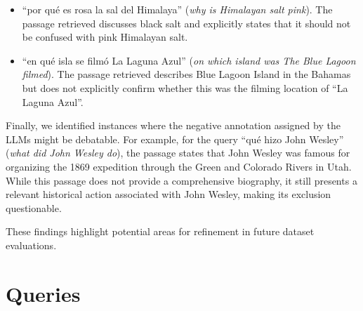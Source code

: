 \documentclass[11pt]{article}
\begin{document}
\begin{itemize}[wide, itemindent=, itemsep=0pt]
    \item ``por qué es rosa la sal del Himalaya'' (\emph{why is Himalayan salt pink}). The passage retrieved discusses black salt and explicitly states that it should not be confused with pink Himalayan salt.
    
    \item ``en qué isla se filmó La Laguna Azul'' (\emph{on which island was The Blue Lagoon filmed}). The passage retrieved describes Blue Lagoon Island in the Bahamas but does not explicitly confirm whether this was the filming location of ``La Laguna Azul''.
    
\end{itemize}

Finally, we identified instances where the negative annotation assigned by the LLMs might be debatable. For example, for the query ``qué hizo John Wesley'' (\emph{what did John Wesley do}), the passage states that John Wesley was famous for organizing the 1869 expedition through the Green and Colorado Rivers in Utah. While this passage does not provide a comprehensive biography, it still presents a relevant historical action associated with John Wesley, making its exclusion questionable.

These findings highlight potential areas for refinement in future dataset evaluations.



\section{Queries} \label{app:queries}
\end{document}
